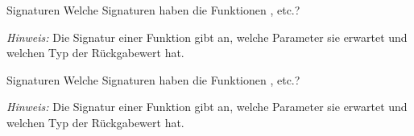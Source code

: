 \begin{task}{Signaturen}
    Welche Signaturen haben die Funktionen ,  etc.?

    \emph{Hinweis:}
    Die Signatur einer Funktion gibt an, welche Parameter sie erwartet und
    welchen Typ der Rückgabewert hat.

    \begin{solution}
    \end{solution}
\end{task}

\begin{task}{Signaturen}
    Welche Signaturen haben die Funktionen ,  etc.?

    \emph{Hinweis:}
    Die Signatur einer Funktion gibt an, welche Parameter sie erwartet und
    welchen Typ der Rückgabewert hat.

    \begin{solution}
    \end{solution}
\end{task}
